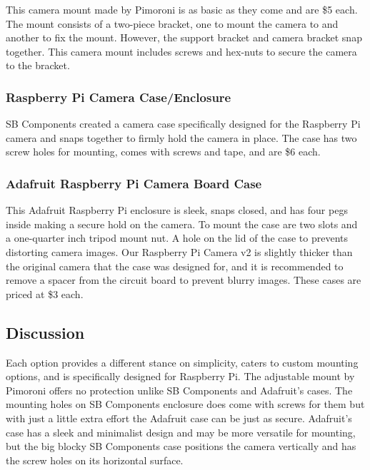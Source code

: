 This camera mount made by Pimoroni is as basic as they come and are \$5 each. The mount 
consists of a two-piece bracket, one to mount the camera to and another to fix the 
mount. However, the support bracket and camera bracket snap together. This camera 
mount includes screws and hex-nuts to secure the camera to the bracket\cite{AdjCamMt}. \\

\subsubsection{Raspberry Pi Camera Case/Enclosure}

SB Components created a camera case specifically designed for the Raspberry Pi camera 
and snaps together to firmly hold the camera in place. The case has two screw holes for 
mounting, comes with screws and tape, and are \$6 each\cite{BlueCase}. \\

\subsubsection{Adafruit Raspberry Pi Camera Board Case}

This Adafruit Raspberry Pi enclosure is sleek, snaps closed, and has four pegs inside making a 
secure hold on the camera. To mount the case are two slots and a 
one-quarter inch tripod mount nut. A hole on the lid of the case to prevents 
distorting camera images. Our Raspberry Pi Camera v2 is slightly thicker than the 
original camera that the case was designed for, and it is recommended to remove a spacer from 
the circuit board to prevent blurry images. These cases are priced at \$3 each\cite{adafruitCase}.\\

\subsection{Discussion}

Each option provides a different stance on simplicity, caters to custom mounting 
options, and is specifically designed for Raspberry Pi. The adjustable mount 
by Pimoroni offers no protection unlike SB Components and Adafruit's cases. The 
mounting holes on SB Components enclosure does come with screws for them but with 
just a little extra effort the Adafruit case can be just as secure. Adafruit's 
case has a sleek and minimalist design and may be more versatile for mounting, but 
the big blocky SB Components case positions the camera vertically and has the 
screw holes on its horizontal surface. \\

